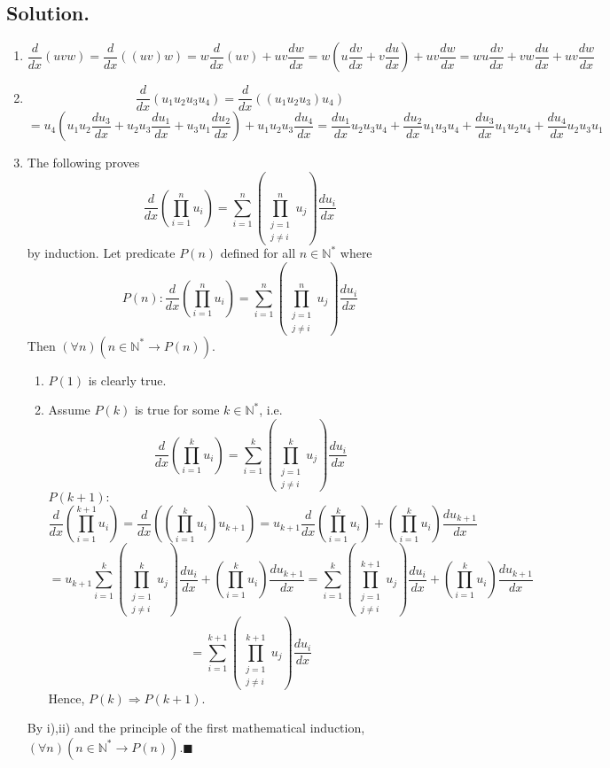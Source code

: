 \documentclass{article}
\begin{document}
\subsection*{Solution.}
\begin{enumerate} [label=\textbf{\alph*.}]
    \item \[\frac{d}{dx}(uvw)=\frac{d}{dx}((uv)w)=w\frac{d}{dx}(uv)+uv\frac{dw}{dx}=w(u\frac{dv}{dx}+v\frac{du}{dx})+uv\frac{dw}{dx}=wu\frac{dv}{dx}+vw\frac{du}{dx}+uv\frac{dw}{dx}\]
    \item \[\frac{d}{dx}(u_1u_2u_3u_4)=\frac{d}{dx}((u_1u_2u_3)u_4)\]
    \[=u_4(u_1u_2\frac{du_3}{dx}+u_2u_3\frac{du_1}{dx}+u_3u_1\frac{du_2}{dx})+u_1u_2u_3\frac{du_4}{dx}=\frac{du_1}{dx}u_2u_3u_4+\frac{du_2}{dx}u_1u_3u_4+\frac{du_3}{dx}u_1u_2u_4+\frac{du_4}{dx}u_2u_3u_1\]
    \item The following proves
    \[\frac{d}{dx}\left(\prod _{i=1}^n u_i\right)=\sum _{i=1}^n \left(\prod_{\substack{j=1\\j\neq i}}^n u_j\right)\frac{du_i}{dx}\]
    by induction.\newline
    Let predicate $P(n)$ defined for all $n\in\mathbb{N}^*$ where
    \[P(n):\frac{d}{dx}\left(\prod _{i=1}^n u_i\right)=\sum _{i=1}^n \left(\prod_{\substack{j=1\\j\neq i}}^n u_j\right)\frac{du_i}{dx}\]
    Then $(\forall n)(n\in \mathbb{N}^*\rightarrow P(n))$.
    \begin{enumerate} [label=\roman*)]
        \item $P(1)$ is clearly true.
        \item Assume $P(k)$ is true for some $k\in\mathbb{N}^*$, i.e. \[\frac{d}{dx}\left(\prod _{i=1}^k u_i\right)=\sum _{i=1}^k \left(\prod_{\substack{j=1\\j\neq i}}^k u_j\right)\frac{du_i}{dx}\]
        $P(k+1):$
        \[\frac{d}{dx}\left(\prod _{i=1}^{k+1} u_i\right)=\frac{d}{dx}\left(\left(\prod _{i=1}^k u_i\right)u_{k+1}\right)=u_{k+1}\frac{d}{dx}\left(\prod _{i=1}^k u_i\right)+\left(\prod _{i=1}^k u_i\right)\frac{du_{k+1}}{dx}\]
        \[=u_{k+1}\sum _{i=1}^k \left(\prod_{\substack{j=1\\j\neq i}}^k u_j\right)\frac{du_i}{dx}+\left(\prod _{i=1}^k u_i\right)\frac{du_{k+1}}{dx}=\sum _{i=1}^k \left(\prod_{\substack{j=1\\j\neq i}}^{k+1} u_j\right)\frac{du_i}{dx}+\left(\prod _{i=1}^k u_i\right)\frac{du_{k+1}}{dx}\]
        \[=\sum _{i=1}^{k+1} \left(\prod_{\substack{j=1\\j\neq i}}^{k+1} u_j\right)\frac{du_i}{dx}\]
        Hence, $P(k)\Rightarrow P(k+1)$.
    \end{enumerate}
    By i),ii) and the principle of the first mathematical induction, $(\forall n)(n\in \mathbb{N}^*\rightarrow P(n)).\blacksquare$
\end{enumerate}
\end{document}
